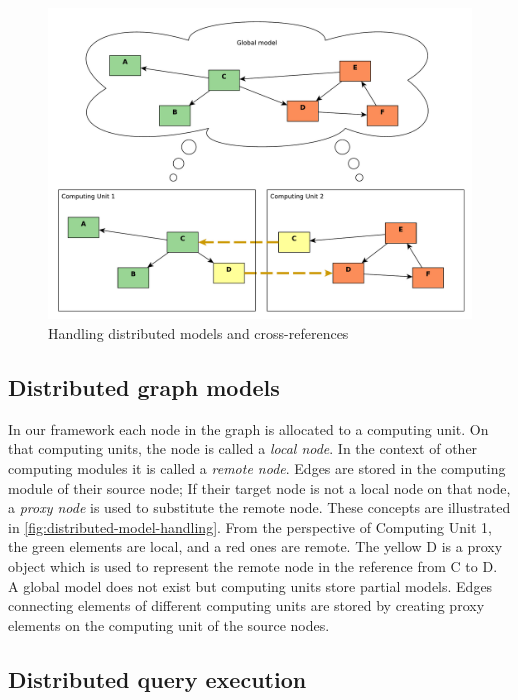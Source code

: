 \begin{figure}[h]
	\begin{center}
		\includegraphics[width=\textwidth]{figures/distributed-model-handling.pdf}
		\caption{Handling distributed models and cross-references}
		\label{fig:distributed-model-handling}
	\end{center}
\end{figure}

\subsection{Distributed graph models}

In our framework each node in the graph is allocated to a computing unit. 
On that computing units, the node is called a \emph{local node}. 
In the context of other computing modules it is called a \emph{remote node}. 
Edges are stored in the computing module of their source node; 
If their target node is not a local node on that node, a \emph{proxy node} is used to substitute the remote node.
These concepts are illustrated in \autoref{fig:distributed-model-handling}.
From the perspective of Computing Unit 1, the green elements are local, and a red ones are remote. The yellow D is a proxy object which is used to represent the remote node in the reference from C to D.
A global model does not exist but computing units store partial models. Edges connecting elements of different computing units are stored by creating proxy elements on the computing unit of the source nodes. 


\subsection{Distributed query execution}

